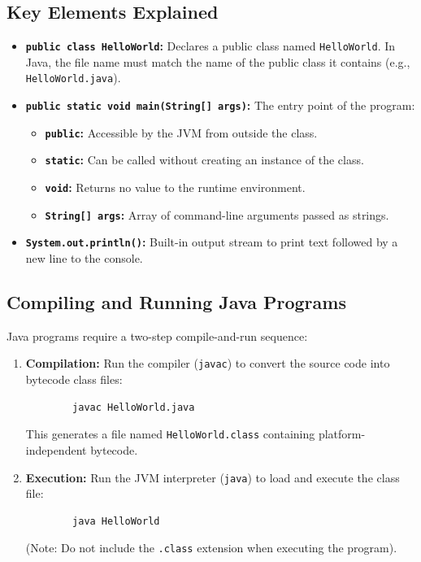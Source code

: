 \documentclass[12pt,a4paper]{article}
\begin{document}
\subsection{Key Elements Explained}
\begin{itemize}[leftmargin=*, itemsep=4pt]
  \item \textbf{\texttt{public class HelloWorld}:} Declares a public class named \texttt{HelloWorld}. In Java, the file name must match the name of the public class it contains (e.g., \texttt{HelloWorld.java}).
  \item \textbf{\texttt{public static void main(String[] args)}:} The entry point of the program:
        \begin{itemize}[leftmargin=*, label=--]
          \item \textbf{\texttt{public}:} Accessible by the JVM from outside the class.
          \item \textbf{\texttt{static}:} Can be called without creating an instance of the class.
          \item \textbf{\texttt{void}:} Returns no value to the runtime environment.
          \item \textbf{\texttt{String[] args}:} Array of command-line arguments passed as strings.
        \end{itemize}
  \item \textbf{\texttt{System.out.println()}:} Built-in output stream to print text followed by a new line to the console.
\end{itemize}

\subsection{Compiling and Running Java Programs}
Java programs require a two-step compile-and-run sequence:
\begin{enumerate}[leftmargin=*, itemsep=3.5pt]
  \item \textbf{Compilation:} Run the compiler (\texttt{javac}) to convert the source code into bytecode class files:
        \begin{verbatim}
        javac HelloWorld.java
        \end{verbatim}
        This generates a file named \texttt{HelloWorld.class} containing platform-independent bytecode.
  \item \textbf{Execution:} Run the JVM interpreter (\texttt{java}) to load and execute the class file:
        \begin{verbatim}
        java HelloWorld
        \end{verbatim}
        (Note: Do not include the \texttt{.class} extension when executing the program).
\end{enumerate}
\end{document}
